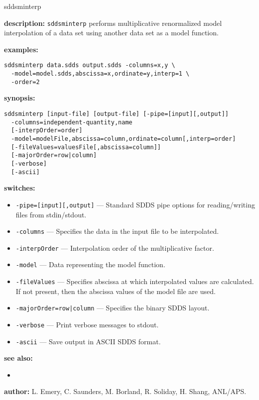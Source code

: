 \begin{sddsprog}{sddsminterp}
  \item \textbf{description:} \verb|sddsminterp| performs multiplicative renormalized model interpolation of a data set using another data set as a model function.
  \item \textbf{examples:}
    \begin{verbatim}
sddsminterp data.sdds output.sdds -columns=x,y \
  -model=model.sdds,abscissa=x,ordinate=y,interp=1 \
  -order=2
    \end{verbatim}
  \item \textbf{synopsis:}
    \begin{verbatim}
sddsminterp [input-file] [output-file] [-pipe=[input][,output]]
  -columns=independent-quantity,name
  [-interpOrder=order]
  -model=modelFile,abscissa=column,ordinate=column[,interp=order]
  [-fileValues=valuesFile[,abscissa=column]]
  [-majorOrder=row|column]
  [-verbose]
  [-ascii]
    \end{verbatim}
  \item \textbf{switches:}
    \begin{itemize}
    \item \verb|-pipe=[input][,output]| --- Standard SDDS pipe options for reading/writing files from stdin/stdout.
    \item \verb|-columns| --- Specifies the data in the input file to be interpolated.
    \item \verb|-interpOrder| --- Interpolation order of the multiplicative factor.
    \item \verb|-model| --- Data representing the model function.
    \item \verb|-fileValues| --- Specifies abscissa at which interpolated values are calculated. If not present, then the abscissa values of the model file are used.
    \item {\tt -majorOrder=row|column} --- Specifies the binary SDDS layout.
    \item \verb|-verbose| --- Print verbose messages to stdout.
    \item \verb|-ascii| --- Save output in ASCII SDDS format.
    \end{itemize}
  \item \textbf{see also:}
    \begin{itemize}
    \item {}
    \end{itemize}
  \item \textbf{author:} L. Emery, C. Saunders, M. Borland, R. Soliday, H. Shang, ANL/APS.
\end{sddsprog}
